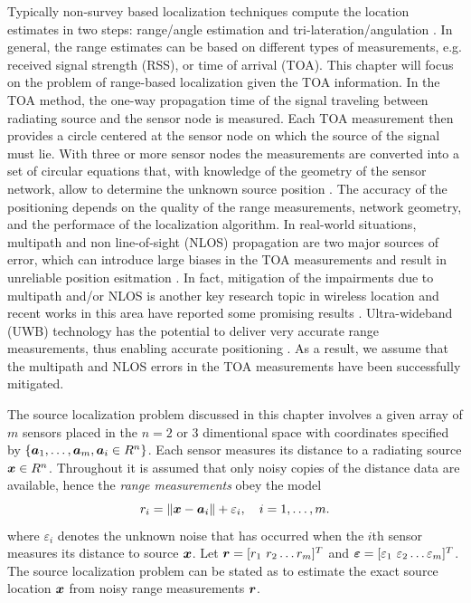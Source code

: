 Typically non-survey based localization techniques compute the location estimates in two steps: range/angle estimation and tri-lateration/angulation \cite{GeoLoc}. In general, the range estimates can be based on different types of measurements, e.g. received signal strength (RSS), %
or time of arrival (TOA). %
This chapter will focus on the  problem of range-based localization given the TOA information. In the TOA method, the one-way propagation time of the signal traveling between radiating source and the sensor node is measured. Each TOA measurement then provides a circle centered at the sensor node on which the source of the signal must lie. With three or more sensor nodes the measurements are converted into a set of circular equations that, with knowledge of the geometry of the sensor network, allow to determine the unknown source position \cite{GeoLoc}. The accuracy of the positioning depends on the quality of the range measurements, network geometry, and the performace of the localization algorithm. In real-world situations, multipath and non line-of-sight (NLOS) propagation are two major sources of error, which can introduce large biases in the TOA measurements and result in unreliable position esitmation \cite{classMDS}. In fact, mitigation of the impairments due to multipath and/or NLOS is another key
research topic in wireless location and recent works in this area have reported some promising results \cite{DarWinUWB}. Ultra-wideband (UWB) technology has the potential to deliver very accurate range measurements, thus enabling accurate positioning \cite{UWB, DarWinUWB, RydstromUWB}. As a result, we assume that the multipath and NLOS errors in the TOA measurements have been successfully mitigated.  

The source localization problem discussed in this chapter involves a given array of $m$ sensors placed in the $n = 2$ or 3 dimentional space with coordinates specified by $\{\mbox{\boldmath$a$}_1,\ldots, \mbox{\boldmath$a$}_m, \mbox{\boldmath$a$}_i\in R^n\}$. Each sensor measures its distance to a radiating source $\mbox{\boldmath$x$}\in R^n$. Throughout it is assumed that only noisy copies of the distance data are available, hence the \textit{range measurements} obey the model
\begin{equation} \label{eq:4.1}
\setcounter{equation}{1}
r_i = \|{\Bx} - {\Ba}_i\| + \varepsilon_i, \quad i = 1, \ldots , m.
\end{equation}    
where $\varepsilon_i$ denotes the unknown noise that has occurred when the $i$th sensor measures its distance to source $\mbox{\boldmath$x$}$. Let $\mbox{\boldmath$r$}=[r_1 \ r_2 \ldots r_m]^T$ and $\mbox{\boldmath${\varepsilon}$}=[\varepsilon_1 \ \varepsilon_2 \ldots \varepsilon_m]^T$.  The source localization problem can be stated as to estimate the exact source location $\mbox{\boldmath$x$}$ from noisy range measurements $\mbox{\boldmath$r$}$. 

